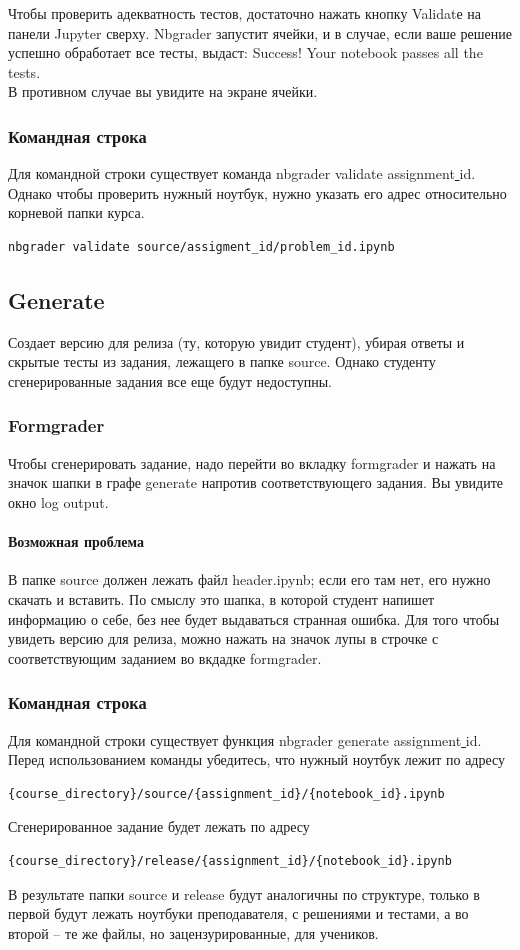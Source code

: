 \documentclass[a4paper,12pt]{article}
\begin{document}
Чтобы проверить адекватность тестов, достаточно нажать кнопку Validatе на панели Jupyter сверху. Nbgrader запустит ячейки, и в случае, если ваше решение успешно обработает все тесты, выдаст:
\grqq Success! Your notebook passes all the tests.\grqq
\\В противном случае вы увидите на экране \grqq ячейки.
\subsubsection{Командная строка}

Для командной строки существует команда nbgrader validate assignment\underline{ }id. Однако чтобы проверить нужный ноутбук, нужно указать его адрес относительно корневой папки курса.
\begin{verbatim}
nbgrader validate source/assigment_id/problem_id.ipynb
\end{verbatim}
\subsection{Generate}

Создает версию для релиза (ту, которую увидит студент), убирая ответы и скрытые тесты из задания, лежащего в папке source. Однако студенту сгенерированные задания все еще будут недоступны.

\subsubsection{Formgrader}

Чтобы сгенерировать задание, надо перейти во вкладку formgrader и нажать на значок шапки в графе generate напротив соответствующего задания. Вы увидите окно log output.
\paragraph{Возможная проблема}
В папке source должен лежать файл header.ipynb; если его там нет, его нужно скачать и вставить. По смыслу это шапка, в которой студент напишет информацию о себе, без нее будет выдаваться странная ошибка.
Для того чтобы увидеть версию для релиза, можно нажать на значок лупы в строчке с соответствующим заданием во вкдадке formgrader.
\subsubsection{Командная строка}

Для командной строки существует функция nbgrader generate assignment\underline{ }id.
Перед использованием команды убедитесь, что нужный ноутбук лежит по адресу 
\begin{verbatim}
{course_directory}/source/{assignment_id}/{notebook_id}.ipynb
\end{verbatim}
Сгенерированное задание будет лежать по адресу
\begin{verbatim}
{course_directory}/release/{assignment_id}/{notebook_id}.ipynb
\end{verbatim}
В результате папки source и release будут аналогичны по структуре, только в первой будут лежать ноутбуки преподавателя, с решениями и тестами, а во второй -- те же файлы, но зацензурированные, для учеников.
\end{document}
